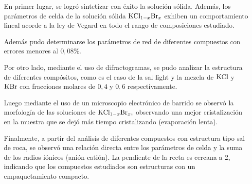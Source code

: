 En primer lugar, se logró sintetizar con éxito la solución sólida. Además, los parámetros de celda de la solución sólida $\ce{KCl_{1-x}Br_x}$ exhiben un comportamiento lineal acorde a la ley de Vegard en todo el rango de composiciones estudiado.

Además pudo determinarse los parámetros de red de diferentes compuestos con errores menores
al $0,08\%.$ 

Por otro lado, mediante el uso de difractogramas, se pudo analizar la estructura de diferentes compósitos,
como es el caso de la sal light y la mezcla de $\ce{KCl}$ y $\ce{KBr}$ con fracciones molares de $0,4$ y $0,6$ respectivamente.

Luego mediante el uso de un microscopio electrónico de barrido se observó la morfología de las soluciones de $\ce{KCl_{1-x}Br_x},$
observando una mejor cristalización en la muestra que se dejó más tiempo cristalizando (evaporación lenta).

Finalmente, a partir del análisis de diferentes compuestos con estructura tipo sal de roca, se observó una relación directa entre los parámetros de celda y la suma de los radios iónicos (anión-catión). La pendiente de la recta es cercana a 2, indicando que los compuestos estudiados son estructuras con un empaquetamiento compacto.